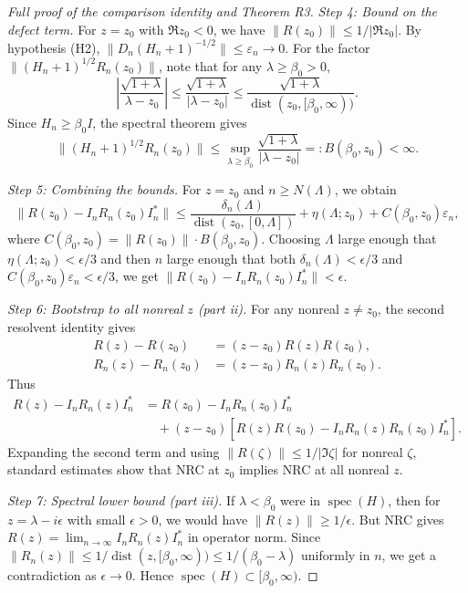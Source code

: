 \documentclass[11pt]{amsart}
\begin{document}
\begin{proof}[Full proof of the comparison identity and Theorem R3]
\emph{Step 4: Bound on the defect term.} For $z = z_0$ with $\Re z_0 < 0$, we have $\|R(z_0)\| \le 1/|\Re z_0|$. By hypothesis (H2), $\|D_n (H_n+1)^{-1/2}\| \le \varepsilon_n \to 0$. For the factor $\|(H_n+1)^{1/2} R_n(z_0)\|$, note that for any $\lambda \ge \beta_0 > 0$,
\[
  \left|\frac{\sqrt{1+\lambda}}{\lambda-z_0}\right| \le \frac{\sqrt{1+\lambda}}{|\lambda-z_0|} \le \frac{\sqrt{1+\lambda}}{\operatorname{dist}(z_0,[\beta_0,\infty))}.
\]
Since $H_n \ge \beta_0 I$, the spectral theorem gives
\[
  \|(H_n+1)^{1/2} R_n(z_0)\| \le \sup_{\lambda \ge \beta_0} \frac{\sqrt{1+\lambda}}{|\lambda-z_0|} =: B(\beta_0,z_0) < \infty.
\]

\emph{Step 5: Combining the bounds.} For $z = z_0$ and $n \ge N(\Lambda)$, we obtain
\[
  \|R(z_0) - I_n R_n(z_0) I_n^*\| \le \frac{\delta_n(\Lambda)}{\operatorname{dist}(z_0,[0,\Lambda])} + \eta(\Lambda;z_0) + C(\beta_0,z_0) \varepsilon_n,
\]
where $C(\beta_0,z_0) = \|R(z_0)\| \cdot B(\beta_0,z_0)$. Choosing $\Lambda$ large enough that $\eta(\Lambda;z_0) < \epsilon/3$ and then $n$ large enough that both $\delta_n(\Lambda) < \epsilon/3$ and $C(\beta_0,z_0) \varepsilon_n < \epsilon/3$, we get $\|R(z_0) - I_n R_n(z_0) I_n^*\| < \epsilon$.

\emph{Step 6: Bootstrap to all nonreal $z$ (part ii).} For any nonreal $z \ne z_0$, the second resolvent identity gives
\begin{align}
  R(z) - R(z_0) &= (z-z_0) R(z) R(z_0), \\
  R_n(z) - R_n(z_0) &= (z-z_0) R_n(z) R_n(z_0).
\end{align}
Thus
\begin{align}
  R(z) - I_n R_n(z) I_n^* &= R(z_0) - I_n R_n(z_0) I_n^* \\
  &\quad + (z-z_0)[R(z) R(z_0) - I_n R_n(z) R_n(z_0) I_n^*].
\end{align}
Expanding the second term and using $\|R(\zeta)\| \le 1/|\Im \zeta|$ for nonreal $\zeta$, standard estimates show that NRC at $z_0$ implies NRC at all nonreal $z$.

\emph{Step 7: Spectral lower bound (part iii).} If $\lambda < \beta_0$ were in $\operatorname{spec}(H)$, then for $z = \lambda - i\epsilon$ with small $\epsilon > 0$, we would have $\|R(z)\| \ge 1/\epsilon$. But NRC gives $R(z) = \lim_{n \to \infty} I_n R_n(z) I_n^*$ in operator norm. Since $\|R_n(z)\| \le 1/\operatorname{dist}(z,[\beta_0,\infty)) \le 1/(\beta_0-\lambda)$ uniformly in $n$, we get a contradiction as $\epsilon \to 0$. Hence $\operatorname{spec}(H) \subset [\beta_0,\infty)$.
\end{proof}
\end{document}
